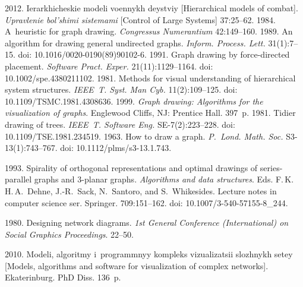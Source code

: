 \begin{multicols}{2}
{{\begin{thebibliography}{99}
    2012. Ierarkhicheskie modeli voennykh deystviy [Hierarchical models of combat]. 
\textit{Upravlenie bol'shimi sistemami} [Control of Large Systems] 37:25--62.
    1984. A~heuristic for graph drawing. \textit{Congressus Numerantium} 42:149--160.
    1989. An algorithm for drawing general undirected graphs. 
\textit{Inform. Process. Lett.} 31(1):7--15. doi: 10.1016/0020-0190(89)90102-6.
    1991. Graph drawing by force-directed placement. 
\textit{Software Pract. Exper.} 
 21(11):1129--1164. doi: 10.1002/spe.4380211102.
    1981. Methods for visual understanding of hierarchical 
system structures. \textit{IEEE~T. Syst. Man Cyb.} 11(2):109--125. doi: 
10.1109/TSMC.1981.4308636.
    1999. \textit{Graph drawing: 
Algorithms for the visualization of graphs}. Englewood Cliffs, NJ: Prentice Hall. 397~p.
    1981. Tidier drawing of trees. \textit{IEEE~T. Software 
Eng.} SE-7(2):223--228. doi: 10.1109/TSE.1981.234519.
    1963. How to draw a graph. \textit{P.~Lond. Math. Soc.} S3-13(1):743--767. doi: 10.1112/plms/s3-13.1.743.

\pagebreak

    1993. Spirality of orthogonal representations and optimal 
drawings of series-parallel graphs 
 and 3-planar graphs. \textit{Algorithms and data structures}. 
 Eds. F.\,K.\,H.\,A.~Dehne, J.-R.~Sack, N.~Santoro, and S.~Whikesides.
 Lecture notes in 
computer science ser. Springer. 709:151--162.
   doi: 10.1007/3-540-57155-8\_244.
 {
 
 }  
    1980. Designing network diagrams. \textit{1st General 
Conference (International) on Social Graphics Proceedings}. 22--50. 
\vspace*{-3pt}

    2010. Modeli, algoritmy i~programmnyy kompleks vizualizatsii slozhnykh setey 
[Models, algorithms and software for visualization of complex networks].  Ekaterinburg. PhD Diss.
136~p.
   \end{thebibliography}
   
    }
    }
   
   \end{multicols}
   
